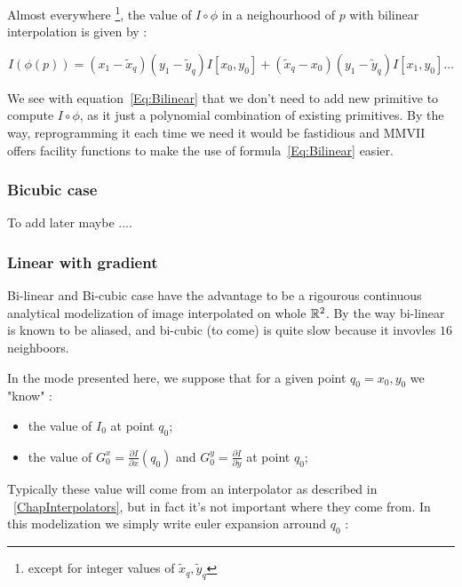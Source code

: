 Almost everywhere \footnote{except for integer values of $\tilde{x}_q,\tilde{y}_q$ }, 
the value of $I \circ \phi$ in a neighourhood of $p$ with  bilinear
interpolation is given by :

\begin{equation}
	I(\phi(p)) =   (x_1-\tilde{x}_q)(y_1-\tilde{y}_q) I[x_0,y_0]  
	             + (\tilde{x}_q-x_0)(y_1-\tilde{y}_q)I[x_1,y_0] \dots 
		     \label{Eq:Bilinear}
\end{equation}

We see with equation~\ref{Eq:Bilinear} that we don't need to add new primitive to compute $I \circ \phi$,
as it just a polynomial combination of existing primitives. By the way, reprogramming it
each time we need it would be fastidious and MMVII offers facility functions to make the use of 
formula~\ref{Eq:Bilinear}  easier.

\subsubsection{Bicubic case}
To add later maybe ....

\subsubsection{Linear with gradient}

\label{ImDifGradMode}

Bi-linear and Bi-cubic case have the advantage to be a rigourous continuous analytical modelization of 
image interpolated on whole $\mathbb{R}^2$.  By the way bi-linear is known to be aliased, and bi-cubic
(to come) is quite slow because it invovles $16$ neighboors.

In the mode presented here, we suppose that for a given point  $q_0 = x_0,y_0 $ we "know" :

\begin{itemize}
    \item  the  value of $I_0$ at point $q_0$;
    \item  the  value of $G^x_0 = \frac{\partial I}{\partial x}(q_0)$  and $G^y_0=\frac{\partial I}{\partial y}$ at point $q_0$;
\end{itemize}

Typically these value will come from an interpolator as described in ~\ref{ChapInterpolators}, but in fact
it's not important where they come from.
In this modelization we simply write  euler expansion arround $q_0$ :

